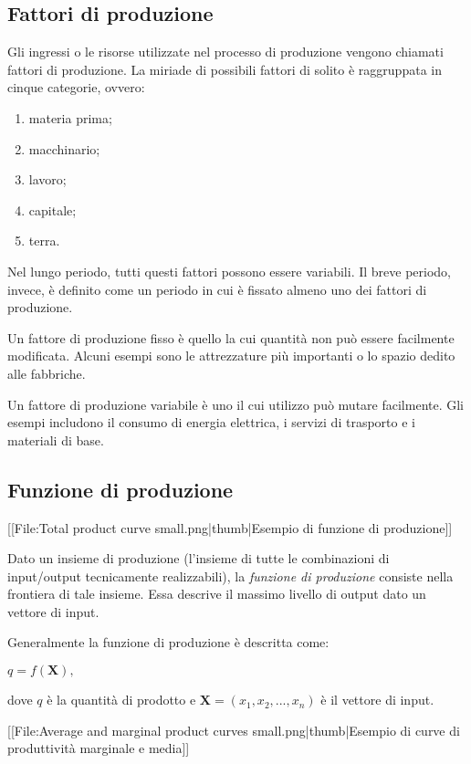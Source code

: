 \subsection{Fattori di produzione}

Gli ingressi o le risorse utilizzate nel processo di produzione vengono 
chiamati fattori di produzione. La miriade di possibili fattori di solito è 
raggruppata in cinque categorie, ovvero:

\begin{enumerate} [noitemsep]
 \item materia prima;
 \item macchinario;
 \item lavoro;
 \item capitale;
 \item terra.
\end{enumerate}

Nel lungo periodo, tutti questi fattori possono essere variabili. Il 
breve periodo, invece, è definito come un periodo in cui è fissato almeno 
uno dei fattori di produzione. %

Un fattore di produzione fisso è quello la cui quantità non può essere 
facilmente modificata. Alcuni esempi sono le attrezzature più importanti o lo 
spazio dedito alle fabbriche.

Un fattore di produzione variabile è uno il cui utilizzo può mutare facilmente. 
Gli esempi includono il consumo di energia elettrica, i servizi di trasporto e 
i materiali di base.

\subsection{Funzione di produzione}

[[File:Total product curve small.png|thumb|Esempio di funzione di produzione]]

Dato un insieme di produzione (l'insieme di tutte le combinazioni di 
input/output tecnicamente realizzabili), la \emph{funzione di produzione} 
consiste nella frontiera di tale insieme. Essa descrive il massimo livello di 
output dato un vettore di input.

Generalmente la funzione di produzione è descritta come:

\(q=f(\mathbf X),\)

dove \(q\) è la quantità di prodotto e 
\(\mathbf X=(x_1, x_2, ..., x_n)\) è il vettore di input.

[[File:Average and marginal product curves small.png|thumb|Esempio di curve di 
produttività marginale e media]]

